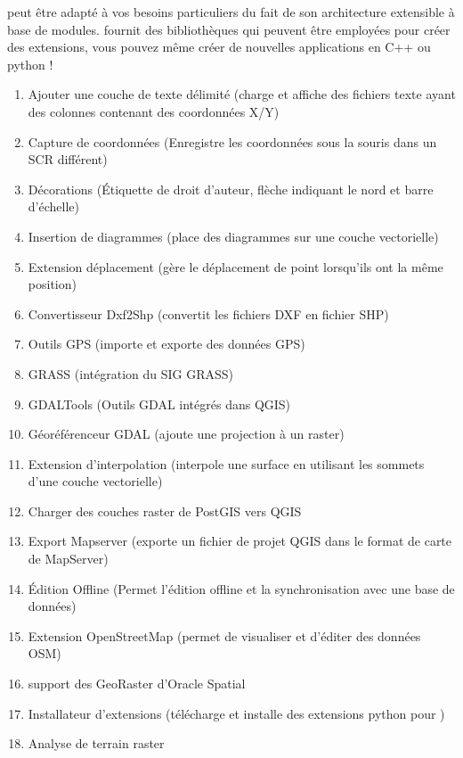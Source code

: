 
\qg peut être adapté à vos besoins particuliers du fait de son architecture 
extensible à base de modules. \qg fournit des bibliothèques qui peuvent être 
employées pour créer des extensions, vous pouvez même créer de nouvelles 
applications en C++ ou python !


\begin{enumerate}
\item Ajouter une couche de texte délimité (charge et affiche des fichiers 
texte ayant des colonnes contenant des coordonnées X/Y)
\item Capture de coordonnées (Enregistre les coordonnées sous la souris dans 
un SCR différent)
\item Décorations (Étiquette de droit d'auteur, flèche indiquant le nord et 
barre d'échelle)
\item Insertion de diagrammes (place des diagrammes sur une couche vectorielle)
\item Extension déplacement (gère le déplacement de point lorsqu'ils ont la même 
position)
\item Convertisseur Dxf2Shp (convertit les fichiers DXF en fichier SHP)
\item Outils GPS (importe et exporte des données GPS)
\item GRASS (intégration du SIG GRASS)
\item GDALTools (Outils GDAL intégrés dans QGIS)
\item Géoréférenceur GDAL (ajoute une projection à un raster)
\item Extension d'interpolation (interpole une surface en utilisant les sommets 
d'une couche vectorielle)
\item Charger des couches raster de PostGIS vers QGIS 
\item Export Mapserver (exporte un fichier de projet QGIS dans le format de 
carte de MapServer)
\item Édition Offline (Permet l'édition offline et la synchronisation avec une 
base de données)
\item Extension OpenStreetMap (permet de visualiser et d'éditer des données OSM)
\item support des GeoRaster d'Oracle Spatial
\item Installateur d'extensions (télécharge et installe des extensions 
python pour \qg)
\item Analyse de terrain raster

\end{enumerate}
